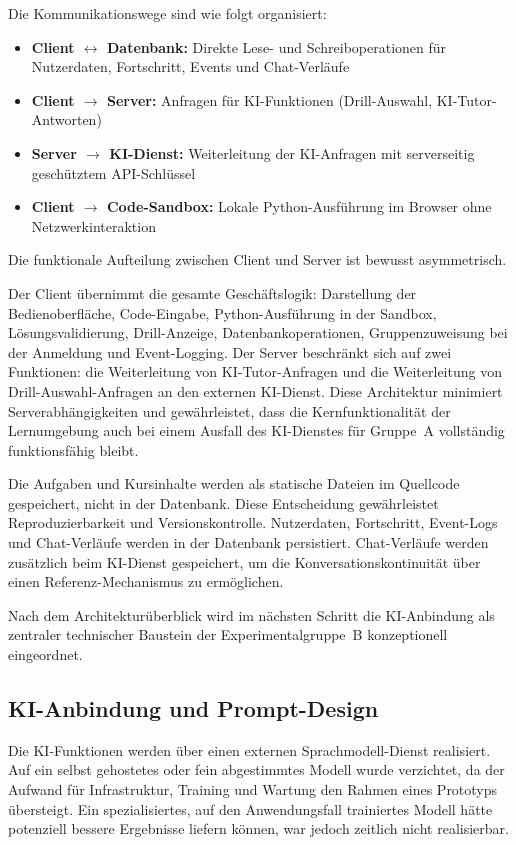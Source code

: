 Die Kommunikationswege sind wie folgt organisiert:

\begin{itemize}
    \item \textbf{Client $\leftrightarrow$ Datenbank:} Direkte Lese- und Schreiboperationen für Nutzerdaten, Fortschritt, Events und Chat-Verläufe
    \item \textbf{Client $\rightarrow$ Server:} Anfragen für KI-Funktionen (Drill-Auswahl, KI-Tutor-Antworten)
    \item \textbf{Server $\rightarrow$ KI-Dienst:} Weiterleitung der KI-Anfragen mit serverseitig geschütztem API-Schlüssel
    \item \textbf{Client $\rightarrow$ Code-Sandbox:} Lokale Python-Ausführung im Browser ohne Netzwerkinteraktion
\end{itemize}

Die funktionale Aufteilung zwischen Client und Server ist bewusst asymmetrisch.

Der Client übernimmt die gesamte Geschäftslogik: Darstellung der Bedienoberfläche, Code-Eingabe, Python-Ausführung in der Sandbox, Lösungsvalidierung, Drill-Anzeige, Datenbankoperationen, Gruppenzuweisung bei der Anmeldung und Event-Logging.
Der Server beschränkt sich auf zwei Funktionen: die Weiterleitung von KI-Tutor-Anfragen und die Weiterleitung von Drill-Auswahl-Anfragen an den externen KI-Dienst.
Diese Architektur minimiert Serverabhängigkeiten und gewährleistet, dass die Kernfunktionalität der Lernumgebung auch bei einem Ausfall des KI-Dienstes für Gruppe~A vollständig funktionsfähig bleibt.

Die Aufgaben und Kursinhalte werden als statische Dateien im Quellcode gespeichert, nicht in der Datenbank.
Diese Entscheidung gewährleistet Reproduzierbarkeit und Versionskontrolle.
Nutzerdaten, Fortschritt, Event-Logs und Chat-Verläufe werden in der Datenbank persistiert.
Chat-Verläufe werden zusätzlich beim KI-Dienst gespeichert, um die Konversationskontinuität über einen Referenz-Mechanismus zu ermöglichen.

Nach dem Architekturüberblick wird im nächsten Schritt die KI-Anbindung als zentraler technischer Baustein der Experimentalgruppe~B konzeptionell eingeordnet.


\subsection{KI-Anbindung und Prompt-Design}\label{subsec:ki-anbindung}

Die KI-Funktionen werden über einen externen Sprachmodell-Dienst realisiert.
Auf ein selbst gehostetes oder fein abgestimmtes Modell wurde verzichtet, da der Aufwand für Infrastruktur, Training und Wartung den Rahmen eines Prototyps übersteigt.
Ein spezialisiertes, auf den Anwendungsfall trainiertes Modell hätte potenziell bessere Ergebnisse liefern können, war jedoch zeitlich nicht realisierbar.


